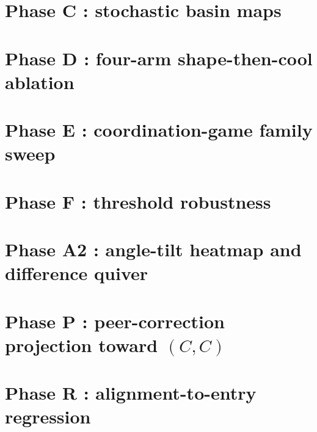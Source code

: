 \documentclass[11pt]{article}
\begin{document}


\section{Phase C : stochastic basin maps}\label{sec:phase-c}



\section{Phase D : four-arm shape-then-cool ablation}\label{sec:phase-d}



\section{Phase E : coordination-game family sweep}\label{sec:phase-e}



\section{Phase F : threshold robustness}\label{sec:phase-f}



\section{Phase A2 : angle-tilt heatmap and difference quiver}\label{sec:phase-a2}



\section{Phase P : peer-correction projection toward $(C,C)$}\label{sec:phase-p}



\section{Phase R : alignment-to-entry regression}\label{sec:phase-r}
\end{document}
